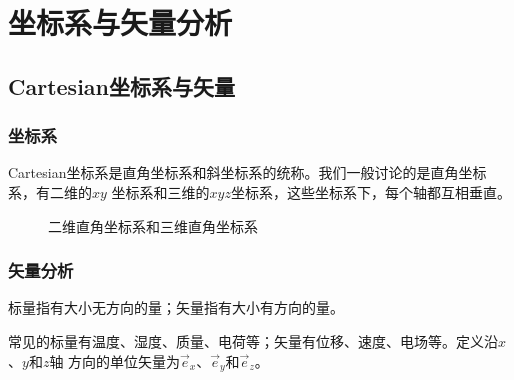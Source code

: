 \chapter{坐标系与矢量分析\label{chapter:reference}}

\section{Cartesian坐标系与矢量\label{section:reference-cartesian}}

\subsection{坐标系}
Cartesian坐标系是直角坐标系和斜坐标系的统称。我们一般讨论的是直角坐标系，有二维的$xy$
坐标系和三维的$xyz$坐标系，这些坐标系下，每个轴都互相垂直。
\begin{figure}[h]
    \centering
    \setlength{\abovecaptionskip}{0.2cm}
    \caption{二维直角坐标系和三维直角坐标系}
    \label{fig:CartesianCoord}
\end{figure}

\subsection{矢量分析}
\begin{definition}[标量和矢量]
    标量指有大小无方向的量；矢量指有大小有方向的量。 
\end{definition}
常见的标量有温度、湿度、质量、电荷等；矢量有位移、速度、电场等。定义沿$x$、$y$和$z$轴
方向的单位矢量为$\vec{e}_x$、$\vec{e}_y$和$\vec{e}_z$。

